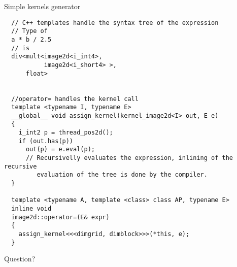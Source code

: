 \documentclass{beamer}
\begin{document}
\begin{frame}[containsverbatim]{Simple kernels generator}

    \begin{lstlisting}
  // C++ templates handle the syntax tree of the expression
  // Type of
  a * b / 2.5
  // is
  div<mult<image2d<i_int4>,
           image2d<i_short4> >,
      float>


  //operator= handles the kernel call
  template <typename I, typename E>
  __global__ void assign_kernel(kernel_image2d<I> out, E e)
  {
    i_int2 p = thread_pos2d();
    if (out.has(p))
      out(p) = e.eval(p);
      // Recursivelly evaluates the expression, inlining of the recursive
         evaluation of the tree is done by the compiler.
  }

  template <typename A, template <class> class AP, typename E>
  inline void
  image2d::operator=(E& expr)
  {
    assign_kernel<<<dimgrid, dimblock>>>(*this, e);
  }

    \end{lstlisting}

\end{frame}

\begin{frame}

 Question?

\end{frame}
\end{document}
